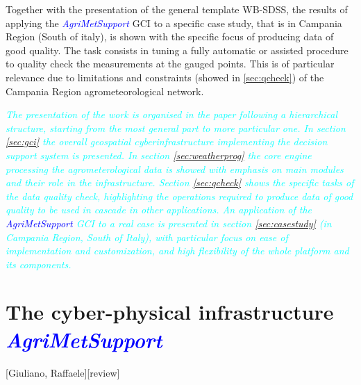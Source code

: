 \documentclass[authoryear,preprint,review,12pt]{elsarticle}
\newcommand{\update}[1]{\emph{\textcolor{blue}{#1}}}
\newcommand{\review}[1]{\emph{\textcolor{cyan}{#1}}}
\newcommand{\gci}{\update{AgriMetSupport}\xspace}
\begin{document}
Together with the presentation of the general template WB-SDSS, the results of applying the \gci GCI to a specific case study, that is in Campania Region (South of italy), is shown with the specific focus of producing data of good quality.
The task consists in tuning a fully automatic or assisted procedure to quality check the measurements at the gauged points.
This is of particular relevance due to limitations and constraints (showed in \cref{sec:qcheck}) of the Campania Region agrometeorological network.

\review{The presentation of the work is organised in the paper following a hierarchical structure, starting from the most general part to more particular one. In section \ref{sec:gci} the overall geospatial cyberinfrastructure implementing the decision support system is presented. In section \ref{sec:weatherprog} the core engine processing the agrometerological data is showed with emphasis on main modules and their role in the infrastructure. Section \ref{sec:qcheck} shows the specific tasks of the data quality check, highlighting the operations required to produce data of good quality to be used in cascade in other applications. An application of the \gci GCI to a real case is presented in section \ref{sec:casestudy} (in Campania Region, South of Italy),  with particular focus on ease of implementation and customization, and high flexibility of the whole platform and its components. }

\section{The cyber-physical infrastructure \gci}[Giuliano, Raffaele][review] \label{sec:gci}
\end{document}
